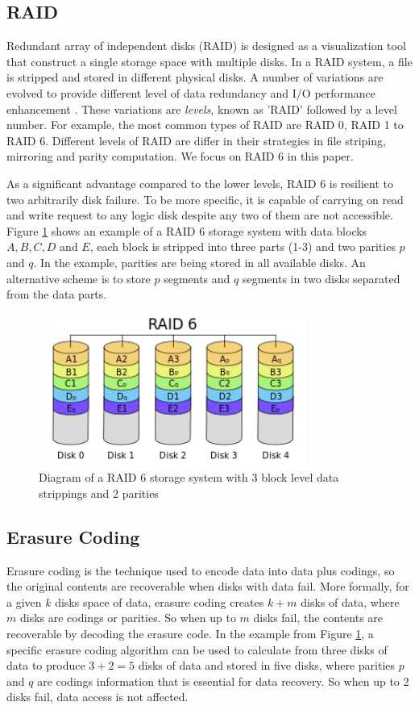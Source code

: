 \subsection{RAID}
Redundant array of independent disks (RAID) is designed as a visualization tool that construct a single storage space with multiple disks. In a RAID system, a file is stripped and stored in different physical disks. A number of variations are evolved to provide different level of data redundancy and I/O performance enhancement \cite{arpaci2012operating}. These variations are \textit{levels}, known as 'RAID' followed by a level number. For example, the most common types of RAID are RAID 0, RAID 1 to RAID 6. Different levels of RAID are differ in their strategies in file striping, mirroring and parity computation. We focus on RAID 6 in this paper.

As a significant advantage compared to the lower levels, RAID 6 is resilient to two arbitrarily disk failure. To be more specific, it is capable of carrying on read and write request to any logic disk despite any two of them are not accessible. Figure \ref{fig:raid6} shows an example of a RAID 6 storage system with data blocks $A, B, C, D$ and $E$, each block is stripped into three parts (1-3) and two parities $p$ and $q$. In the example, parities are being stored in all available disks. An alternative scheme is to store $p$ segments and $q$ segments in two disks separated from the data parts.

\begin{figure}[t]
	\includegraphics[width=9cm,height=5cm,angle=0]{RAID6.png}
	\caption{Diagram of a RAID 6 storage system with 3 block level data strippings and 2 parities \cite{wiki:raid} }
	\label{fig:raid6}
\end{figure}


\subsection{Erasure Coding}

Erasure coding is the technique used to encode data into data plus codings, so the original contents are recoverable when disks with data fail. More formally, for a given $k$ disks space of data, erasure coding creates $k+m$ disks of data, where $m$ disks are codings or parities. So when up to $m$ disks fail, the contents are recoverable by decoding the erasure code. In the example from Figure \ref{fig:raid6}, a specific erasure coding algorithm can be used to calculate from three disks of data to produce $3+2=5$ disks of data and stored in five disks, where parities $p$ and $q$ are codings information that is essential for data recovery. So when up to 2 disks fail, data access is not affected.



